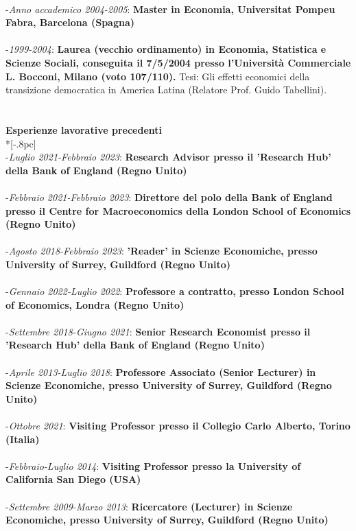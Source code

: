 \documentclass[10p]{article}
\begin{document}
\\
-\emph{Anno accademico 2004-2005}: {\bf Master in Economia, Universitat Pompeu Fabra, Barcelona (Spagna)} \\
\\
-\emph{1999-2004}: {\bf Laurea (vecchio ordinamento) in Economia, Statistica e Scienze Sociali, conseguita il 7/5/2004 presso l'Universit\`{a} Commerciale L. Bocconi, Milano (voto 107/110).} Tesi: Gli effetti economici della transizione democratica in America Latina (Relatore Prof. Guido Tabellini).\\
\\
\\
{\large \bf Esperienze lavorative precedenti} \\*[-.8pc]
\underline{\hspace{6in}} \\
-\emph{Luglio 2021-Febbraio 2023}: {\bf Research Advisor presso il 'Research Hub' della Bank of England (Regno Unito)} \\
\\
-\emph{Febbraio 2021-Febbraio 2023}: {\bf Direttore del polo della Bank of England presso il Centre for Macroeconomics della London School of Economics (Regno Unito)} \\
\\
-\emph{Agosto 2018-Febbraio 2023}: {\bf 'Reader' in Scienze Economiche, presso University of Surrey, Guildford (Regno Unito)} \\
\\
-\emph{Gennaio 2022-Luglio 2022}: {\bf Professore a contratto, presso London School of Economics, Londra (Regno Unito)} \\
\\
-\emph{Settembre 2018-Giugno 2021}: {\bf Senior Research Economist presso il 'Research Hub' della Bank of England (Regno Unito)} \\
\\
-\emph{Aprile 2013-Luglio 2018}: {\bf Professore Associato (Senior Lecturer) in Scienze Economiche, presso University of Surrey, Guildford (Regno Unito)} \\
\\
-\emph{Ottobre 2021}: {\bf Visiting Professor presso il Collegio Carlo Alberto, Torino (Italia)} \\
\\
-\emph{Febbraio-Luglio 2014}: {\bf Visiting Professor presso la University of California San Diego (USA)} \\
\\
-\emph{Settembre 2009-Marzo 2013}: {\bf Ricercatore (Lecturer) in  Scienze Economiche, presso University of Surrey, Guildford (Regno Unito)} \\
\end{document}
